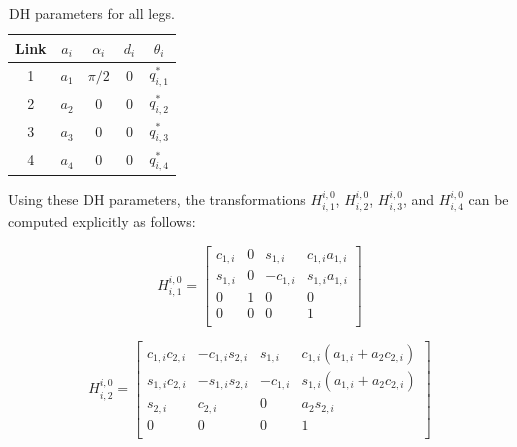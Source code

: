 			\begin{table}[h]
				\centering
				\begin{tabularx}{150mm}{|C{0.2}|C{0.2}|C{0.2}|C{0.2}|C{0.2}|} \hline
					\textbf{Link}	&\textbf{$a_i$} &	\textbf{$\alpha_i$}	&	\textbf{$d_i$}	&	\textbf{$\theta_i$} \\ \hline {}				&	$a_{1}$		&	$\pi/2$				&	0				&	$q_{i,1}^*$			\\ 				&	$a_{2}$		&	0					&	0				&	$q_{i,2}^*$			\\ 				&	$a_{3}$		&	0					&	0				&	$q_{i,3}^*$			\\  				&	$a_{4}$		&	0					&	0				&	$q_{i,4}^*$			\\ \hline
				\end{tabularx}
				\caption{DH parameters for all legs.}
				\label{tab::dh_params}
			\end{table}
			
			\noindent
			Using these DH parameters, the transformations $H^{i,0}_{i,1}$, $H^{i,0}_{i,2}$, $H^{i,0}_{i,3}$, and $H^{i,0}_{i,4}$ can be computed explicitly as follows:

				\begin{equation} 
					H^{i,0}_{i,1} =\left[ 
					\begin{array}{ccc|c}
						c_{1,i} 	&  		0	& 	s_{1,i}		&		c_{1,i} a_{1,i}	\\
						s_{1,i} 	&  		0	& 	-c_{1,i}	&		s_{1,i} a_{1,i}	\\
						0 			&  		1	& 	0			&		0 				\\ \hline
						0 			&  		0	& 	0			&		1 				\\
					\end{array} 
					\right]
				\end{equation}


				\begin{equation}
					H^{i,0}_{i,2} =\left[ 
					\begin{array}{ccc|c}
						c_{1,i} c_{2,i}	&  		-c_{1,i} s_{2,i}	& 		s_{1,i}		&	c_{1,i}( a_{1,i} + a_2 c_{2,i} )\\
						s_{1,i} c_{2,i}	&  		-s_{1,i} s_{2,i}	& 		-c_{1,i}	&	s_{1,i}( a_{1,i} + a_2 c_{2,i} )\\
						s_{2,i} 		&  		c_{2,i}			 	& 		0			&	a_2 s_{2,i} 					\\ \hline
						0 			&  		0			 		& 		0			&	1 								\\
					\end{array} 
					\right]
				\end{equation}


